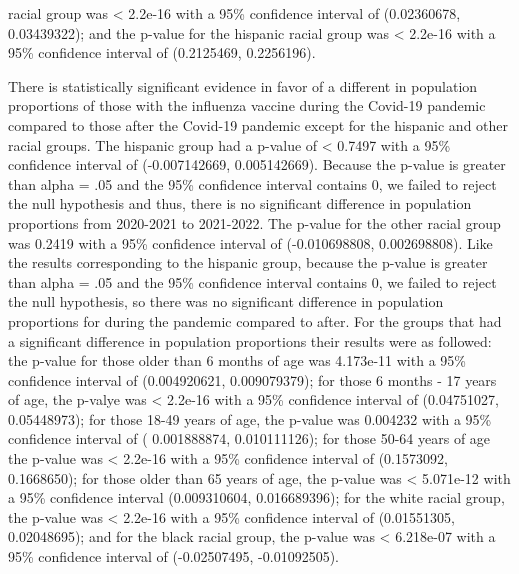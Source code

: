 \documentclass[12pt]{article}
\begin{document}
racial group was < 2.2e-16 with a 95\% confidence interval of (0.02360678, 0.03439322); and the p-value for the hispanic racial group was < 2.2e-16 with a 95\% confidence
interval of (0.2125469, 0.2256196). \par
There is statistically significant evidence in favor of a different in population proportions of those with the influenza vaccine during the Covid-19 pandemic
compared to those after the Covid-19 pandemic except for the hispanic and other racial groups. The hispanic group had a p-value of < 0.7497 with a 95\% confidence interval of 
(-0.007142669, 0.005142669). Because the p-value is greater than alpha = .05 and the 95\% confidence interval contains 0, we failed to reject the null hypothesis and thus, there is no
significant difference in population proportions from 2020-2021 to 2021-2022. The p-value for the other racial group was 0.2419 with a 95\% confidence interval of (-0.010698808, 0.002698808).
Like the results corresponding to the hispanic group, because the p-value is greater than alpha = .05 and the 95\% confidence interval contains 0, we failed to reject the null hypothesis, so there
was no significant difference in population proportions for during the pandemic compared to after. For the groups that had a significant difference in population proportions their results were as followed:
the p-value for those older than 6 months of age was 4.173e-11 with a 95\% confidence interval of (0.004920621, 0.009079379); for those 6 months - 17 years of age, the p-valye was < 2.2e-16  with a 95\%
confidence interval of (0.04751027, 0.05448973); for those 18-49 years of age, the p-value was 0.004232 with a 95\% confidence interval of ( 0.001888874, 0.010111126); for those 50-64 years of age the p-value was
< 2.2e-16 with a 95\% confidence interval of (0.1573092, 0.1668650); for those older than 65 years of age, the p-value was < 5.071e-12 with a 95\% confidence interval (0.009310604, 0.016689396); for the white racial group,
the p-value was < 2.2e-16 with a 95\% confidence interval of (0.01551305, 0.02048695); and for the black racial group, the p-value was < 6.218e-07 with a 95\% confidence interval of (-0.02507495, -0.01092505).
\end{document}
